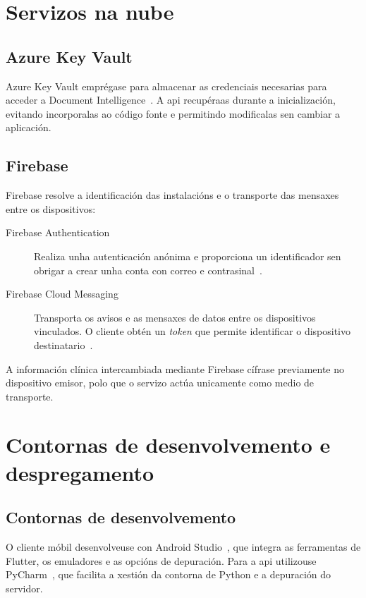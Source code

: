 \section{Servizos na nube}

\subsection{Azure Key Vault}

Azure Key Vault emprégase para almacenar as credenciais necesarias para acceder a Document Intelligence~\cite{AzureKeyVault}. A \gls{api} recupéraas durante a inicialización, evitando incorporalas ao código fonte e permitindo modificalas sen cambiar a aplicación.

\subsection{Firebase}
\label{sec:firebase}

Firebase resolve a identificación das instalacións e o transporte das mensaxes entre os dispositivos:

\begin{description}
    \item[Firebase Authentication] Realiza unha autenticación anónima e proporciona un identificador sen obrigar a crear unha conta con correo e contrasinal~\cite{FirebaseAuthentication}.

    \item[Firebase Cloud Messaging] Transporta os avisos e as mensaxes de datos entre os dispositivos vinculados. O cliente obtén un \textit{token} que permite identificar o dispositivo destinatario~\cite{FirebaseCloudMessaging}.
\end{description}

A información clínica intercambiada mediante Firebase cífrase previamente no dispositivo emisor, polo que o servizo actúa unicamente como medio de transporte.

\section{Contornas de desenvolvemento e despregamento}

\subsection{Contornas de desenvolvemento}

O cliente móbil desenvolveuse con Android Studio~\cite{AndroidStudio}, que integra as ferramentas de Flutter, os emuladores e as opcións de depuración. Para a \gls{api} utilizouse PyCharm~\cite{PyCharm}, que facilita a xestión da contorna de Python e a depuración do servidor.

